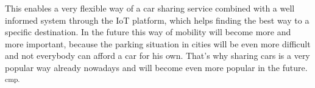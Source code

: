 This enables a very flexible way of a car sharing service combined with a well informed system through the IoT platform, which helps finding the best way to a specific destination. In the future this way of mobility will become more and more important, because the parking situation in cities will be even more difficult and not everybody can afford a car for his own. That's why sharing cars is a very popular way already nowadays and will become even more popular in the future.  \textsuperscript{cmp.\cite{37}}


